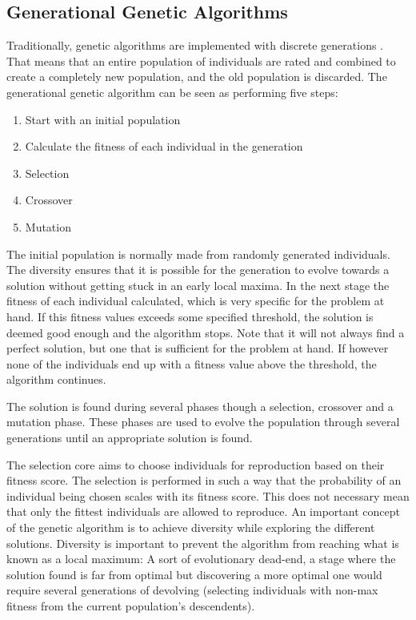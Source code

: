\subsection{Generational Genetic Algorithms} \label{background:generational_genetic_algorithms}
Traditionally, genetic algorithms are implemented with discrete generations . That means that an entire population of individuals are rated and combined to create a completely new population, and the old population is discarded. The generational genetic algorithm can be seen as performing five steps:


\begin{enumerate}
    \item Start with an initial population
    \item Calculate the fitness of each individual in the generation
    \item Selection
    \item Crossover
    \item Mutation  
\end{enumerate}

The initial population is normally made from randomly generated individuals.
The diversity ensures that it is possible for the generation to evolve towards a solution without getting stuck in an early local maxima.
In the next stage the fitness of each individual calculated, which is very specific for the problem at hand.
If this fitness values exceeds some specified threshold, the solution is deemed good enough and the algorithm stops.
Note that it will not always find a perfect solution, but one that is sufficient for the problem at hand.
If however none of the individuals end up with a fitness value above the threshold, the algorithm continues.

The solution is found during several phases though a selection, crossover and a mutation phase. 
These phases are used to evolve the population through several generations until an appropriate solution is found. 

The selection core aims to choose individuals for reproduction based on their fitness score.
The selection is performed in such a way that the probability of an individual being chosen scales with its fitness score.
This does not necessary mean that only the fittest individuals are allowed to reproduce.
An important concept of the genetic algorithm is to achieve diversity while exploring the different solutions.
Diversity is important to prevent the algorithm from reaching what is known as a local maximum:
A sort of evolutionary dead-end, a stage where the solution found is far from optimal but discovering a more optimal one would require several generations of devolving (selecting individuals with non-max fitness from the current population's descendents).

